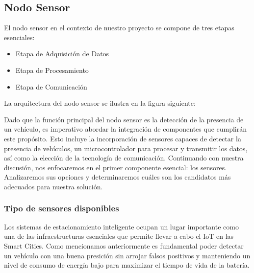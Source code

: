 \subsection{Nodo Sensor}
El nodo sensor en el contexto de nuestro proyecto se compone de tres etapas esenciales:

\begin{itemize}
\item Etapa de Adquisición de Datos
\item Etapa de Procesamiento
\item Etapa de Comunicación
\end{itemize}

La arquitectura del nodo sensor se ilustra en la figura siguiente:


Dado que la función principal del nodo sensor es la detección de la presencia de un vehículo, es imperativo abordar la integración de componentes que cumplirán este propósito. Esto incluye la incorporación de sensores capaces de detectar la presencia de vehículos, un microcontrolador para procesar y transmitir los datos, así como la elección de la tecnología de comunicación. Continuando con nuestra discusión, nos enfocaremos en el primer componente esencial: los sensores. Analizaremos sus opciones y determinaremos cuáles son los candidatos más adecuados para nuestra solución.

\subsubsection{Tipo de sensores disponibles}
Los sistemas de estacionamiento inteligente ocupan un lugar importante como una de las
infraestructuras esenciales que permite llevar a cabo el IoT en las Smart Cities. Como mencionamos anteriormente es fundamental poder detectar un vehículo con una buena presición sin arrojar falsos positivos y manteniendo un nivel de consumo de energía bajo para maximizar el tiempo de vida de la batería. 

